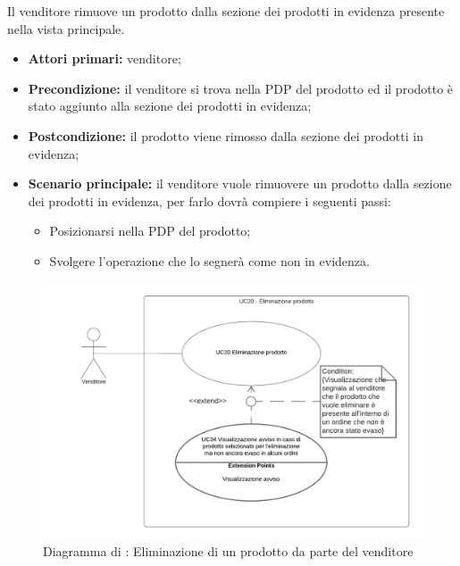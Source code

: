 Il venditore rimuove un prodotto dalla sezione dei prodotti in evidenza presente nella vista principale.
\begin{itemize}
    \item \textbf{Attori primari:} venditore;
    \item \textbf{Precondizione:} il venditore si trova nella PDP del prodotto ed il prodotto è stato aggiunto alla sezione dei prodotti in evidenza;
    \item \textbf{Postcondizione:} il prodotto viene rimosso dalla sezione dei prodotti in evidenza; 
    \item \textbf{Scenario principale:} il venditore vuole rimuovere un prodotto dalla sezione dei prodotti in evidenza, per farlo dovrà compiere i seguenti passi:
    \begin{itemize}
        \item Posizionarsi nella PDP del prodotto;
        \item Svolgere l'operazione che lo segnerà come non in evidenza.
    \end{itemize}
\end{itemize}

\begin{figure}[H]
    \centering
    \includegraphics[width=\textwidth]{Immagini/DiagrammiUC/UC20EliminazioneProdotto}
    \caption{Diagramma di \actualUC: Eliminazione di un prodotto da parte del venditore} 
    \label{fig:EliminazioneProdotto}
\end{figure}

